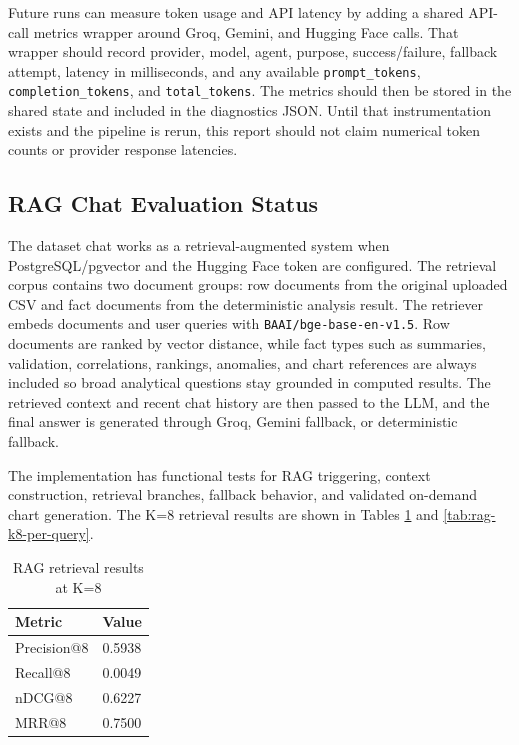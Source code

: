 \documentclass[12pt,a4paper,openany]{report}
\begin{document}
Future runs can measure token usage and API latency by adding a shared API-call metrics wrapper around Groq, Gemini, and Hugging Face calls. That wrapper should record provider, model, agent, purpose, success/failure, fallback attempt, latency in milliseconds, and any available \texttt{prompt\_tokens}, \texttt{completion\_tokens}, and \texttt{total\_tokens}. The metrics should then be stored in the shared state and included in the diagnostics JSON. Until that instrumentation exists and the pipeline is rerun, this report should not claim numerical token counts or provider response latencies.

\subsection{RAG Chat Evaluation Status}
The dataset chat works as a retrieval-augmented system when PostgreSQL/pgvector and the Hugging Face token are configured. The retrieval corpus contains two document groups: row documents from the original uploaded CSV and fact documents from the deterministic analysis result. The retriever embeds documents and user queries with \texttt{BAAI/bge-base-en-v1.5}. Row documents are ranked by vector distance, while fact types such as summaries, validation, correlations, rankings, anomalies, and chart references are always included so broad analytical questions stay grounded in computed results. The retrieved context and recent chat history are then passed to the LLM, and the final answer is generated through Groq, Gemini fallback, or deterministic fallback.

The implementation has functional tests for RAG triggering, context construction, retrieval branches, fallback behavior, and validated on-demand chart generation. The K=8 retrieval results are shown in Tables \ref{tab:rag-k8-summary} and \ref{tab:rag-k8-per-query}.

\begin{table}[H]
\centering
\caption{RAG retrieval results at K=8}
\label{tab:rag-k8-summary}
\begin{tabular}{p{4cm} p{3cm}}
\hline
Metric & Value \\
\hline
Precision@8 & 0.5938 \\
Recall@8 & 0.0049 \\
nDCG@8 & 0.6227 \\
MRR@8 & 0.7500 \\
\hline
\end{tabular}
\end{table}
\end{document}
